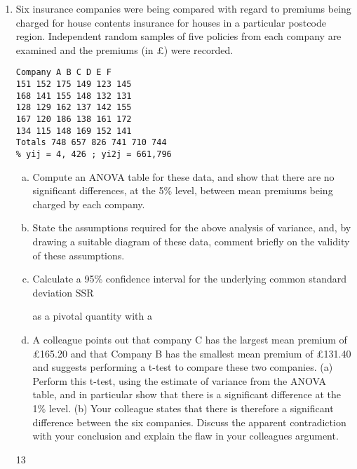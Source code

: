 \documentclass[a4paper,12pt]{article}
\begin{document}
\begin{enumerate}

\item  Six insurance companies were being compared with regard to premiums being
charged for house contents insurance for houses in a particular postcode region.
Independent random samples of five policies from each company are examined and
the premiums (in £) were recorded.

\begin{verbatim}
Company A B C D E F
151 152 175 149 123 145
168 141 155 148 132 131
128 129 162 137 142 155
167 120 186 138 161 172
134 115 148 169 152 141
Totals 748 657 826 741 710 744
% yij = 4, 426 ; yi2j = 661,796
\end{verbatim}


\begin{enumerate}[(a)]
\item Compute an ANOVA table for these data, and show that there are no
significant differences, at the 5\% level, between mean premiums being
charged by each company. 
\item State the assumptions required for the above analysis of variance, and, by
drawing a suitable diagram of these data, comment briefly on the validity of
these assumptions. 
\item Calculate a 95\% confidence interval for the underlying common standard
deviation %
SSR

as a pivotal quantity with a %
\item A colleague points out that company C has the largest mean premium of
£165.20 and that Company B has the smallest mean premium of £131.40 and
suggests performing a t-test to compare these two companies.
(a) Perform this t-test, using the estimate of variance from the ANOVA
table, and in particular show that there is a significant difference at the
1\% level.
(b) Your colleague states that there is therefore a significant difference
between the six companies.
Discuss the apparent contradiction with your conclusion and
explain the flaw in your colleagues argument. 
\end{enumerate}

13 
\begin{itemize}


\end{itemize}
\end{enumerate}
\end{document}

